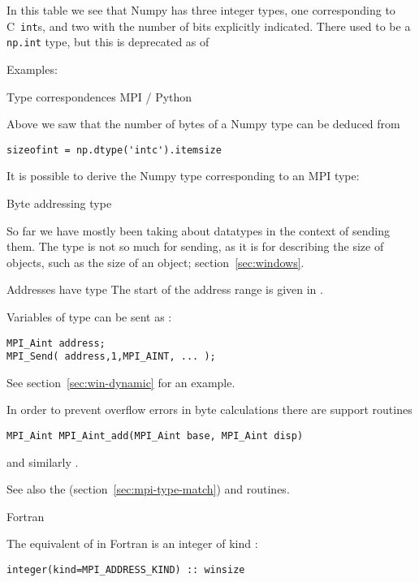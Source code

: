 In this table we see that
Numpy has three integer types,
one corresponding to C~\lstinline{int}s,
and two with the number of bits explicitly indicated.
There used to be a \lstinline{np.int} type,
but this is deprecated as of 

Examples:



 {Type correspondences MPI / Python}

Above we saw that the number of bytes of a Numpy type can be deduced from
\lstset{language=Python}
\begin{lstlisting}
sizeofint = np.dtype('intc').itemsize  
\end{lstlisting}

It is possible to derive the Numpy type corresponding to an MPI type:

\lstset{language=C}

 {Byte addressing type}
\label{sec:mpi-byte-type}

So far we have mostly been taking about datatypes in the context of
sending them. The  type is not so much for
sending, as it is for describing the size of objects, such as the size
of an  object; section~\ref{sec:windows}.

Addresses have type  The start of the address range is
given in .

Variables of type  can be sent as :
\begin{lstlisting}
MPI_Aint address;
MPI_Send( address,1,MPI_AINT, ... );
\end{lstlisting}
See section~\ref{sec:win-dynamic} for an example.

In order to prevent overflow errors in byte calculations
there are support routines 
\begin{lstlisting}
MPI_Aint MPI_Aint_add(MPI_Aint base, MPI_Aint disp)
\end{lstlisting}
and similarly .

See also the 
(section~\ref{sec:mpi-type-match})
and
 routines.

 {Fortran}

The equivalent of
 in Fortran
is an integer of kind :
\lstset{style=reviewcode,language=Fortran} %
\begin{lstlisting}
integer(kind=MPI_ADDRESS_KIND) :: winsize
\end{lstlisting}
\lstset{style=reviewcode,language=C} %

